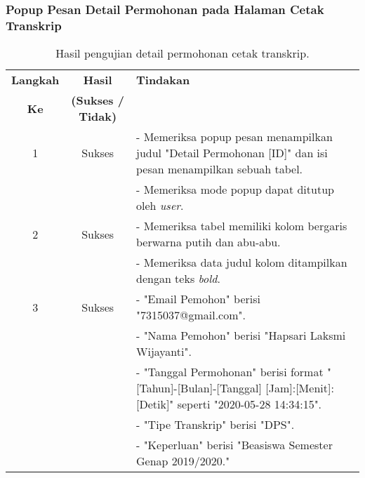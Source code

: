 \subsubsection{Popup Pesan Detail Permohonan pada Halaman Cetak Transkrip}
\begin{table}[H]
	\centering 
	\caption{Hasil pengujian detail permohonan cetak transkrip.}
	\label{hasil:DetailCetakTranskrip}
	\begin{tabular}{|c| c| p{}|}
		\toprule
		\textbf{Langkah} & \textbf{Hasil} & \textbf{Tindakan}\\
		\textbf{Ke} & \textbf{(Sukses / Tidak)} &\\
		\midrule
		1&Sukses& - Memeriksa popup pesan menampilkan judul "Detail Permohonan [ID]" dan isi pesan menampilkan sebuah tabel.\\
		&& - Memeriksa mode popup dapat ditutup oleh \textit{user}.\\
		\hline
		2&Sukses&- Memeriksa tabel memiliki kolom bergaris berwarna putih dan abu-abu.\\
		&& - Memeriksa data judul kolom ditampilkan dengan teks \textit{bold}.	\\	
		\hline
		3&Sukses&- "Email Pemohon" berisi "7315037@gmail.com".\\
		&&- "Nama Pemohon" berisi "Hapsari Laksmi Wijayanti".\\
		&&- "Tanggal Permohonan" berisi format "[Tahun]-[Bulan]-[Tanggal] [Jam]:[Menit]:[Detik]" seperti "2020-05-28 14:34:15".\\
		&&- "Tipe Transkrip" berisi "DPS".\\
		&&- "Keperluan" berisi "Beasiswa Semester Genap 2019/2020."\\
		\bottomrule		
	\end{tabular} 
\end{table}

